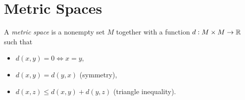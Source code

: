 \chapter{Metric Spaces}
\begin{defn}
  A \emph{metric space} is a nonempty set $M$ together with a function
  $d:M\times M\to\mathbb{R}$ such that
  \begin{itemize}
    \item $d(x,y)=0\iff x=y$,
    \item $d(x,y)=d(y,x)$ (symmetry), 
    \item $d(x,z)\le d(x,y)+d(y,z)$ (triangle inequality).
  \end{itemize}
\end{defn}
